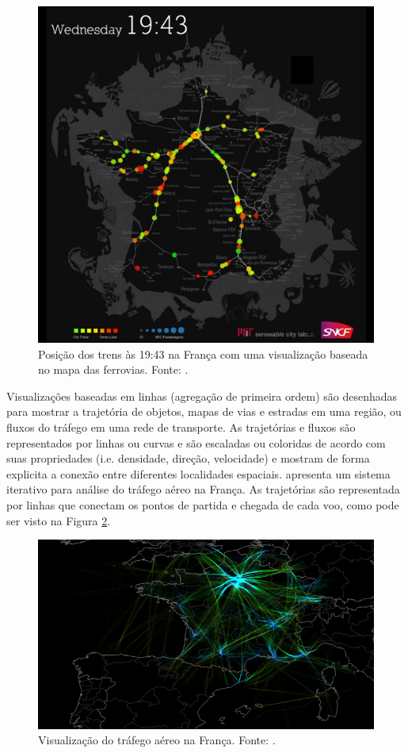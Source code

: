 \begin{figure}[!htb]
  \centering
  \includegraphics[width=.6\textwidth]{../figuras/trains-of-data.jpg}
  \caption[Visualização baseada no mapa das ferrovias da França]{Posição dos trens às 19:43 na França com uma visualização baseada no mapa
das ferrovias. Fonte: \citet{Senseable2018}.}
  \label{fig:trains-of-data}
\end{figure}

Visualizações baseadas em linhas (agregação de primeira ordem) são
desenhadas para mostrar a trajetória de objetos, mapas de vias e estradas em
uma região, ou fluxos do tráfego em uma rede de transporte. As trajetórias e
fluxos são representados por linhas ou curvas e são escaladas ou coloridas de
acordo com suas propriedades (i.e. densidade, direção, velocidade) e mostram de forma
explicita a conexão entre diferentes localidades espaciais. \citet{Klein2014} apresenta
um sistema iterativo para análise do tráfego aéreo na França. As trajetórias são
representada por linhas que conectam os pontos de partida e chegada de cada voo,
como pode ser visto na Figura \ref{fig:air-traffic}.

\begin{figure}[!htb]
  \centering
  \includegraphics[width=1\textwidth]{../figuras/air-traffic.png}
  \caption[Visualização do tráfego aéreo na França]{Visualização do tráfego aéreo na França. Fonte: \citet{Klein2014}.}
  \label{fig:air-traffic}
\end{figure}

